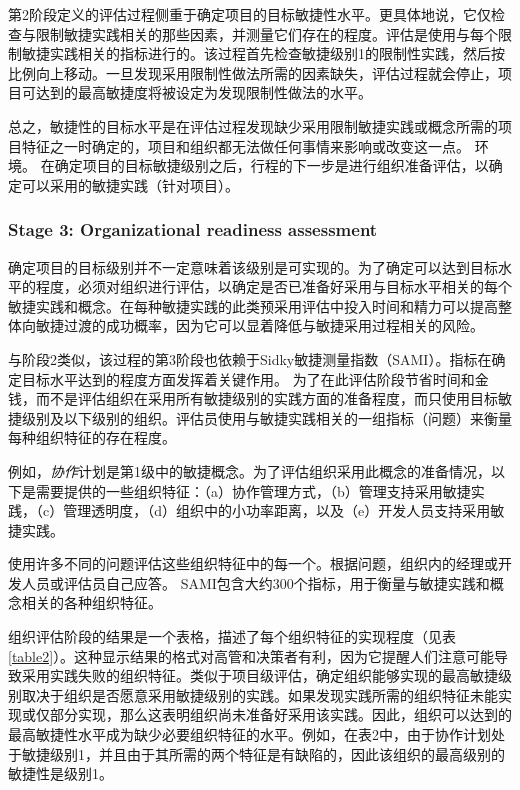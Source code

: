 \documentclass[twocolumn]{svjour3}[]
\begin{document}
第2阶段定义的评估过程侧重于确定项目的目标敏捷性水平。更具体地说，它仅检查与限制敏捷实践相关的那些因素，并测量它们存在的程度。评估是使用与每个限制敏捷实践相关的指标进行的。该过程首先检查敏捷级别1的限制性实践，然后按比例向上移动。一旦发现采用限制性做法所需的因素缺失，评估过程就会停止，项目可达到的最高敏捷度将被设定为发现限制性做法的水平。

总之，敏捷性的目标水平是在评估过程发现缺少采用限制敏捷实践或概念所需的项目特征之一时确定的，项目和组织都无法做任何事情来影响或改变这一点。 环境。 在确定项目的目标敏捷级别之后，行程的下一步是进行组织准备评估，以确定可以采用的敏捷实践（针对项目）。

\subsubsection{Stage 3: Organizational readiness assessment}
\label{section3.2.2}

确定项目的目标级别并不一定意味着该级别是可实现的。为了确定可以达到目标水平的程度，必须对组织进行评估，以确定是否已准备好采用与目标水平相关的每个敏捷实践和概念。在每种敏捷实践的此类预采用评估中投入时间和精力可以提高整体向敏捷过渡的成功概率\cite{boehm2005management}，因为它可以显着降低与敏捷采用过程相关的风险。

与阶段2类似，该过程的第3阶段也依赖于Sidky敏捷测量指数（SAMI）。指标在确定目标水平达到的程度方面发挥着关键作用。 为了在此评估阶段节省时间和金钱，而不是评估组织在采用所有敏捷级别的实践方面的准备程度，而只使用目标敏捷级别及以下级别的组织。评估员使用与敏捷实践相关的一组指标（问题）来衡量每种组织特征的存在程度。

例如，\textit{协作}计划是第1级中的敏捷概念。为了评估组织采用此概念的准备情况，以下是需要提供的一些组织特征：（a）协作管理方式，（b）管理支持采用敏捷实践，（c）管理透明度，（d）组织中的小功率距离，以及（e）开发人员支持采用敏捷实践。

使用许多不同的问题评估这些组织特征中的每一个。根据问题，组织内的经理或开发人员或评估员自己应答。 SAMI包含大约300个指标，用于衡量与敏捷实践和概念相关的各种组织特征\cite{sidky2006agile}。

组织评估阶段的结果是一个表格，描述了每个组织特征的实现程度（见表\ref{table2}）。这种显示结果的格式对高管和决策者有利，因为它提醒人们注意可能导致采用实践失败的组织特征。类似于项目级评估，确定组织能够实现的最高敏捷级别取决于组织是否愿意采用敏捷级别的实践。如果发现实践所需的组织特征未能实现或仅部分实现，那么这表明组织尚未准备好采用该实践。因此，组织可以达到的最高敏捷性水平成为缺少必要组织特征的水平。例如，在表2中，由于协作计划处于敏捷级别1，并且由于其所需的两个特征是有缺陷的，因此该组织的最高级别的敏捷性是级别1。
\end{document}
